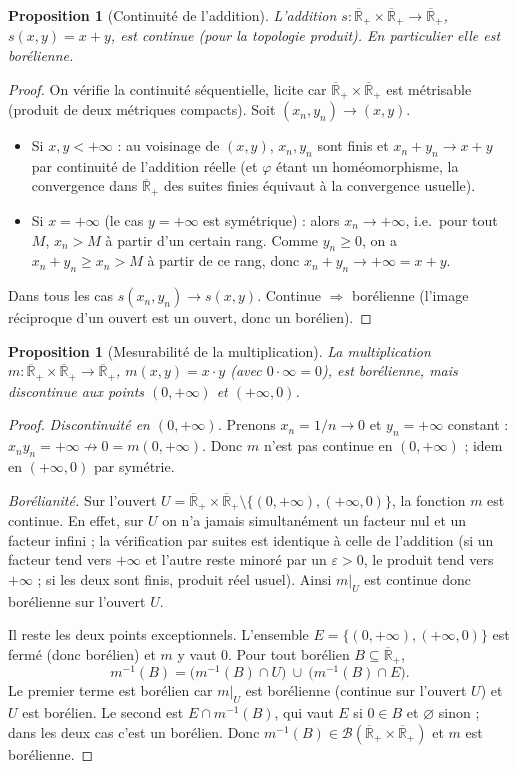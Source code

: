 \documentclass[11pt,a4paper]{article}
\theoremstyle{plain}
\newtheorem{proposition}[theorem]{Proposition}
\theoremstyle{definition}
\newcommand{\Rpb}{\overline{\mathbb{R}}_+}
\newcommand{\B}{\mathcal{B}}
\newcommand{\eps}{\varepsilon}
\begin{document}
\begin{proposition}[Continuité de l'addition]\label{prop:add-continue}
L'addition $s:\Rpb\times\Rpb\to\Rpb$, $s(x,y)=x+y$, est continue (pour la
topologie produit). En particulier elle est borélienne.
\end{proposition}

\begin{proof}
On vérifie la continuité séquentielle, licite car $\Rpb\times\Rpb$ est
métrisable (produit de deux métriques compacts). Soit $(x_n,y_n)\to(x,y)$.
\begin{itemize}[nosep]
\item Si $x,y<+\infty$ : au voisinage de $(x,y)$, $x_n,y_n$ sont finis et
$x_n+y_n\to x+y$ par continuité de l'addition réelle (et $\varphi$ étant un
homéomorphisme, la convergence dans $\Rpb$ des suites finies équivaut à la
convergence usuelle).
\item Si $x=+\infty$ (le cas $y=+\infty$ est symétrique) : alors $x_n\to+\infty$,
i.e.\ pour tout $M$, $x_n>M$ à partir d'un certain rang. Comme $y_n\ge0$, on a
$x_n+y_n\ge x_n>M$ à partir de ce rang, donc $x_n+y_n\to+\infty=x+y$.
\end{itemize}
Dans tous les cas $s(x_n,y_n)\to s(x,y)$. Continue $\Rightarrow$ borélienne
(l'image réciproque d'un ouvert est un ouvert, donc un borélien).
\end{proof}

\begin{proposition}[Mesurabilité de la multiplication]\label{prop:mult-mesurable}
La multiplication $m:\Rpb\times\Rpb\to\Rpb$, $m(x,y)=x\cdot y$ (avec
$0\cdot\infty=0$), est \emph{borélienne}, mais \emph{discontinue} aux points
$(0,+\infty)$ et $(+\infty,0)$.
\end{proposition}

\begin{proof}
\emph{Discontinuité en $(0,+\infty)$.} Prenons $x_n=1/n\to0$ et
$y_n=+\infty$ constant : $x_n y_n=+\infty\not\to0=m(0,+\infty)$. Donc $m$ n'est
pas continue en $(0,+\infty)$ ; idem en $(+\infty,0)$ par symétrie.

\emph{Borélianité.} Sur l'ouvert
$U=\Rpb\times\Rpb\setminus\{(0,+\infty),(+\infty,0)\}$, la fonction $m$ est
continue. En effet, sur $U$ on n'a jamais simultanément un facteur nul et un
facteur infini ; la vérification par suites est identique à celle de
l'addition (si un facteur tend vers $+\infty$ et l'autre reste minoré par un
$\eps>0$, le produit tend vers $+\infty$ ; si les deux sont finis, produit
réel usuel). Ainsi $m|_U$ est continue donc borélienne sur l'ouvert $U$.

Il reste les deux points exceptionnels. L'ensemble
$E=\{(0,+\infty),(+\infty,0)\}$ est fermé (donc borélien) et $m$ y vaut $0$.
Pour tout borélien $B\subseteq\Rpb$,
\[
m^{-1}(B)=\big(m^{-1}(B)\cap U\big)\ \cup\ \big(m^{-1}(B)\cap E\big).
\]
Le premier terme est borélien car $m|_U$ est borélienne (continue sur l'ouvert
$U$) et $U$ est borélien. Le second est $E\cap m^{-1}(B)$, qui vaut $E$ si
$0\in B$ et $\varnothing$ sinon ; dans les deux cas c'est un borélien. Donc
$m^{-1}(B)\in\B(\Rpb\times\Rpb)$ et $m$ est borélienne.
\end{proof}
\end{document}
